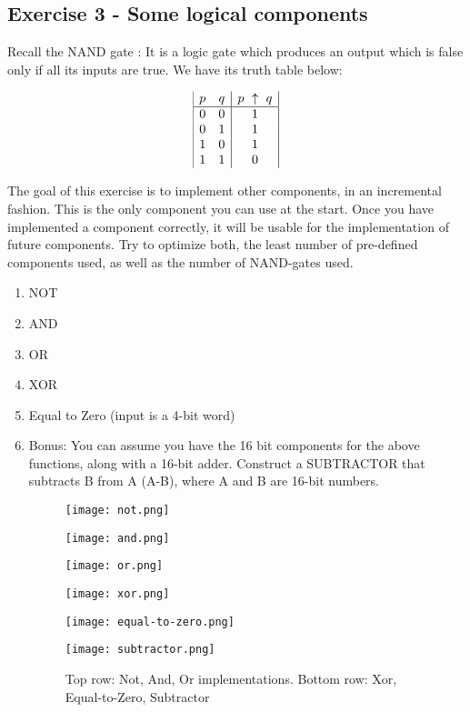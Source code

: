\documentclass[11pt]{article}
\begin{document}
\subsection*{Exercise 3 - Some logical components}

Recall the NAND gate : It is a logic gate which produces an output which is false only if all its inputs are true. We have its truth table below:

\begin{displaymath}
	\begin{array}{|c c|c|}
	
		p & q & p ~\uparrow~ q\\ %
		\hline %
		0 & 0 & 1\\
		0 & 1 & 1\\
		1 & 0 & 1\\
		1 & 1 & 0\\
	\end{array}
\end{displaymath}


The goal of this exercise is to implement other components, in an incremental fashion. This is the only component you can use at the start. Once you have implemented a component correctly, it will be usable for the implementation of future components. Try to optimize both, the least number of pre-defined components used, as well as the number of NAND-gates used.

\begin{enumerate}
	\item NOT 
	\item AND 
	\item OR 
	\item XOR 
	\item Equal to Zero (input is a 4-bit word)
	\item Bonus: You can assume you have the 16 bit components for the above functions, along with a 16-bit adder. Construct a SUBTRACTOR that subtracts B from A (A-B), where A and B are 16-bit numbers.
	
	\begin{figure*}[h!]
		\begin{multicols}{3}
			\texttt{[image: not.png]}\par 
			\texttt{[image: and.png]}\par 
				\texttt{[image: or.png]}\par
		\end{multicols}
		\begin{multicols}{3}
		\texttt{[image: xor.png]}\par
				\texttt{[image: equal-to-zero.png]}\par
					\texttt{[image: subtractor.png]}\par
		\end{multicols}
		\caption{Top row: Not, And, Or implementations. Bottom row: Xor, Equal-to-Zero, Subtractor  }
	\end{figure*}

	\end{enumerate}
\end{document}
